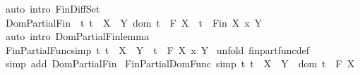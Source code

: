 \begin{isabellebody}
\isamarkupfalse%
\ {\isacharparenleft}auto\ intro{\isacharcolon}\ Fin{\isacharunderscore}Diff{\isacharunderscore}Set{\isacharparenright}\isanewline
{}\isamarkupfalse%
%
\endisatagproof
{\isafoldproof}%
%
\isadelimproof
\isanewline
%
\endisadelimproof
\isanewline
{}\isamarkupfalse%
\ Dom{\isacharunderscore}Partial{\isacharunderscore}Fin{\isacharcolon}\ {\isachardoublequoteopen}{\isacharbang}{\isacharbang}\ t{\isachardot}\ {\isacharbrackleft}{\isacharbar}t\ {\isacharcolon}\ {\isacharparenleft}X\ {\isacharminus}{\isacharbar}{\isacharminus}{\isachargreater}\ Y{\isacharparenright}{\isacharsemicolon}\ dom\ t\ {\isacharcolon}\ {\isacharpercent}F\ X{\isacharbar}{\isacharbrackright}\ {\isacharequal}{\isacharequal}{\isachargreater}\ {\isacharparenleft}t\ {\isacharcolon}\ Fin\ {\isacharparenleft}X\ {\isacharpercent}x\ Y{\isacharparenright}{\isacharparenright}{\isachardoublequoteclose}\isanewline
%
\isadelimproof
%
\endisadelimproof
%
\isatagproof
{}\isamarkupfalse%
\ {\isacharparenleft}auto\ intro{\isacharcolon}\ Dom{\isacharunderscore}Partial{\isacharunderscore}Fin{\isacharunderscore}lemma{\isacharparenright}\isanewline
{}\isamarkupfalse%
%
\endisatagproof
{\isafoldproof}%
%
\isadelimproof
\isanewline
%
\endisadelimproof
\isanewline
{}\isamarkupfalse%
\ Fin{\isacharunderscore}Partial{\isacharunderscore}Func{\isacharbrackleft}simp{\isacharbrackright}{\isacharcolon}\ {\isachardoublequoteopen}{\isacharbang}{\isacharbang}t{\isachardot}\ t\ {\isacharcolon}\ {\isacharparenleft}X\ {\isacharminus}{\isacharbar}{\isacharbar}{\isacharminus}{\isachargreater}\ Y{\isacharparenright}\ {\isacharequal}{\isacharequal}{\isachargreater}\ t\ {\isacharcolon}\ {\isacharpercent}F\ {\isacharparenleft}X\ {\isacharpercent}x\ Y{\isacharparenright}{\isachardoublequoteclose}\isanewline
%
\isadelimproof
%
\endisadelimproof
%
\isatagproof
{}\isamarkupfalse%
\ {\isacharparenleft}unfold\ fin{\isacharunderscore}part{\isacharunderscore}func{\isacharunderscore}def{\isacharparenright}\isanewline
{}\isamarkupfalse%
\ {\isacharparenleft}simp\ add{\isacharcolon}\ Dom{\isacharunderscore}Partial{\isacharunderscore}Fin{\isacharparenright}\isanewline
{}\isamarkupfalse%
%
\endisatagproof
{\isafoldproof}%
%
\isadelimproof
\isanewline
%
\endisadelimproof
\isanewline
{}\isamarkupfalse%
\ Fin{\isacharunderscore}Partial{\isacharunderscore}Dom{\isacharunderscore}Func\ {\isacharbrackleft}simp{\isacharbrackright}{\isacharcolon}\ {\isachardoublequoteopen}{\isacharbang}{\isacharbang}t{\isachardot}\ t\ {\isacharcolon}\ {\isacharparenleft}X\ {\isacharminus}{\isacharbar}{\isacharbar}{\isacharminus}{\isachargreater}\ Y{\isacharparenright}\ {\isacharequal}{\isacharequal}{\isachargreater}\ dom\ t\ {\isacharcolon}\ {\isacharpercent}F\ X{\isachardoublequoteclose}\isanewline

\end{isabellebody}
